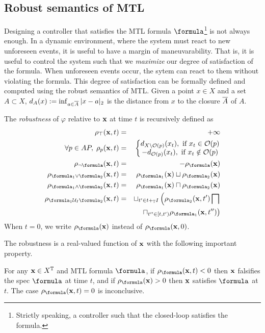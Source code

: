 \subsection{Robust semantics of MTL}
\label{sec:rob sem}
Designing a controller that satisfies the MTL formula $\formula$\footnote{Strictly speaking, a controller such that the closed-loop satisfies the formula.} is not always enough.
In a dynamic environment, where the system must react to new unforeseen events, it is useful to have a margin of maneuvarability.
That is, it is useful to control the system such that we \textit{maximize} our degree of satisfaction of the formula.
When unforeseen events occur, the sytem can react to them without violating the formula.
This degree of satisfaction can be formally defined and computed using the robust semantics of MTL.
Given a point $x \in X$ and a set $A \subset X$, $d_A(x) := \inf_{a \in \overline{A}}|x-a|_2$ is the distance from $x$  to the closure $\overline{A}$ of $A$.
\begin{definition}
	\label{def:robustness estimate}
	The \emph{robustness} of $\varphi$ relative to $\mathbf{x}$ at time $t$ is recursively defined as 
	\begin{eqnarray*}
		\label{eq:robustness estimate}
		\rob_{\top} (\sstraj,t) &=& +\infty
		\\
		\forall p \in AP, \;  \rob_{p} (\sstraj,t) &=& \left \lbrace \begin{matrix}
			d_{\stSet \setminus \Oc(p)}(\stPt_t), \text{ if } \stPt_t \in \Oc(p)
			\\
			-d_{ \Oc(p)}(\stPt_t), \text{ if } \stPt_t \notin \Oc(p)			
		\end{matrix} \right.
		\\
		\rob_{\lnot \formula} (\sstraj,t) &=& - \rob_{\formula} (\sstraj)
		\\
		\rob_{ \formula_1 \lor \formula_2} (\sstraj,t) &=& \rob_{\formula_1} (\sstraj) \sqcup \rob_{\formula_2} (\sstraj) 
		\\
		\rob_{ \formula_1 \land \formula_2} (\sstraj,t) &=& \rob_{\formula_1} (\sstraj) \sqcap \rob_{\formula_2} (\sstraj) 
		\\
		\rob_{ \formula_1 \until_I \formula_2} (\sstraj,t) &=& \sqcup_{t' \in t+_{\TDom}I} \left(\rob_{\formula_2} (\sstraj,t') \bigsqcap \right.
		\\
		&& \left. \sqcap_{t'' \in [t,t')}   \rob_{\formula_1} (\sstraj,t'') \right) 
	\end{eqnarray*}
	When $t=0$, we write $\robf(\sstraj)$ instead of $\robf(\sstraj,0)$.
\end{definition}
The robustness is a real-valued function of $\mathbf{x}$ with the following important property.
\begin{theorem} \cite{FainekosP09tcs}
	\label{thm:rob objective}
	For any $\mathbf{x} \in X^{\mathbb{T}}$ and MTL formula $\formula$, 
	if $\robf(\sstraj,t) <0$ then $\mathbf{x}$ falsifies the spec $\formula$ at time $t$, and if $\robf(\sstraj) > 0$ then $\mathbf{x}$ satisfies $\formula$ at $t$. 
	The case $\robf(\sstraj,t) =0$ is inconclusive.
\end{theorem} 

